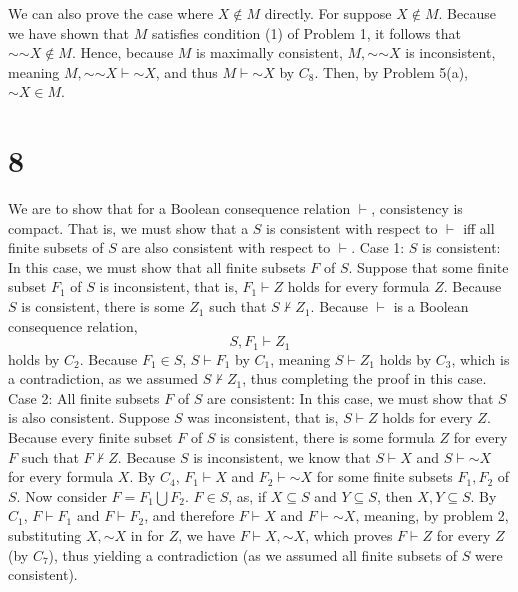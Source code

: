 \documentclass{article}
\newcommand*{\oldneg}{\mathord{\sim}}
\theoremstyle{definition}
\begin{document}
We can also prove the case where $X\notin M$ directly. For suppose $X\notin M$. Because we have shown that $M$ satisfies condition (1) of Problem 1, 
it follows that $\oldneg\oldneg X\notin M$. Hence, because $M$ is maximally consistent, $M,\oldneg\oldneg X$ is inconsistent, meaning 
$M,\oldneg\oldneg X\vdash \oldneg X$, and thus $M\vdash \oldneg X$ by $C_8$. Then, by Problem 5(a), $\oldneg X\in M$.

\section*{8}
We are to show that for a Boolean consequence relation $\vdash$, consistency is compact. That is, we must show that a $S$ is consistent with 
respect to $\vdash$ iff all finite subsets of $S$ are also consistent with respect to $\vdash$.\newline
Case 1: $S$ is consistent:\newline
In this case, we must show that all finite subsets $F$ of $S$. Suppose that some finite subset $F_1$ of $S$ is inconsistent, that is, 
$F_1\vdash Z$ holds for every formula $Z$. Because $S$ is consistent, there is some $Z_1$ such that $S\nvdash Z_1$. Because $\vdash$ is a Boolean 
consequence relation, \[ S,F_1\vdash Z_1 \] holds by $C_2$. Because $F_1\in S$, $S\vdash F_1$ by $C_1$, meaning $S\vdash Z_1$ holds by $C_3$, which 
is a contradiction, as we assumed $S\nvdash Z_1$, thus completing the proof in this case.\newline
Case 2: All finite subsets $F$ of $S$ are consistent:\newline
In this case, we must show that $S$ is also consistent. Suppose $S$ was inconsistent, that is, $S\vdash Z$ holds for every $Z$. Because every finite 
subset $F$ of $S$ is consistent, there is some formula $Z$ for every $F$ such that $F\nvdash Z$. Because $S$ is inconsistent, 
we know that $S\vdash X$ and $S\vdash \oldneg X$ for every formula $X$. By $C_4$, $F_1\vdash X$ 
and $F_2\vdash\oldneg X$ for some finite subsets $F_1,F_2$ of $S$. Now consider $F=F_1\bigcup F_2$. $F\in S$, as, if $X\subseteq S$ and $Y\subseteq S$, then 
$X,Y\subseteq S$. By $C_1$, $F\vdash F_1$ and $F\vdash F_2$, and therefore $F\vdash X$ and $F\vdash\oldneg X$, meaning, by problem 2, substituting 
$X,\oldneg X$ in for $Z$, we have $F\vdash X,\oldneg X$, which proves $F\vdash Z$ for every $Z$ (by $C_7$), thus yielding a contradiction (as we 
assumed all finite subsets of $S$ were consistent).   
\end{document}
